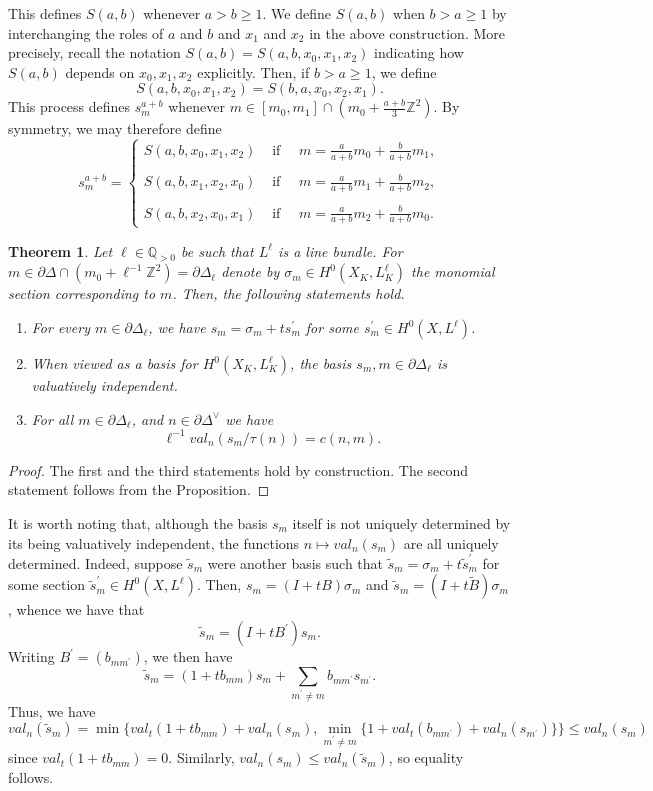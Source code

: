 \documentclass{article}
\newcommand{\QQ}{\mathbb{Q}}
\newcommand{\ZZ}{\mathbb{Z}}
\newtheorem{theorem}{Theorem}
\begin{document}
This defines $S(a,b)$ whenever $a>b\geq 1$. We define $S(a,b)$ when $b>a\geq 1$ by interchanging the roles of $a$ and $b$ and $x_1$ and $x_2$ in the above construction. More precisely, recall the notation $S(a,b) = S(a,b,x_0,x_1,x_2)$ indicating how $S(a,b)$ depends on  $x_0,x_1,x_2$ explicitly. Then, if $b>a\geq 1$, we define
\[
S(a,b,x_0,x_1,x_2) = S(b,a,x_0,x_2,x_1).
\]
This process defines $s^{a+b}_m$ whenever $m\in[m_0,m_1]\cap(m_0+\frac{a+b}{3}\ZZ^2)$. By symmetry, we may therefore define
\[
s^{a+b}_m = \begin{cases}
    S(a,b,x_0,x_1,x_2) & \textrm{ if }\quad m=\frac{a}{a+b}m_0+\frac{b}{a+b}m_1,\\
    \\
    S(a,b,x_1,x_2,x_0) & \textrm{ if }\quad m=\frac{a}{a+b}m_1+\frac{b}{a+b}m_2,\\
    \\
    S(a,b,x_2,x_0,x_1) & \textrm{ if }\quad m=\frac{a}{a+b}m_2+\frac{b}{a+b}m_0.
\end{cases} 
\]
\begin{theorem}
    Let $\ell\in\QQ_{>0}$ be such that $L^\ell$ is a line bundle. For $m\in\partial\Delta\cap(m_0+\ell^{-1}\ZZ^2) = \partial\Delta_\ell$ denote by $\sigma_m \in H^0(X_K,L_K^\ell)$ the monomial section corresponding to $m$. Then, the following statements hold.
    \begin{enumerate}
        \item For every $m\in\partial\Delta_\ell$, we have $s_m= \sigma_m + ts_m^\prime$ for some $s_m^\prime \in H^0(X,L^\ell)$.
        \item When viewed as a basis for $H^0(X_K,L^\ell_K)$, the basis $s_m, m\in\partial\Delta_\ell$ is valuatively independent.
        \item For all $m\in\partial\Delta_\ell$, and $n\in\partial\Delta^\vee$ we have 
        \[
        \ell^{-1}val_n(s_m/\tau(n))=c(n,m).
        \]
    \end{enumerate}  
\end{theorem}
\begin{proof}
    The first and the third statements hold by construction. The second statement follows from the Proposition.
\end{proof}

It is worth noting that, although the basis $s_m$ itself is not uniquely determined by its being valuatively independent, the functions $n\mapsto val_n(s_m)$ are all uniquely determined. Indeed, suppose $\tilde s_m$ were another basis such that $\tilde s_m = \sigma_m + t\tilde s_m^\prime$ for some section $\tilde s^\prime_m\in H^0(X,L^\ell)$. Then, $s_m=(I+tB)\sigma_m$ and $\tilde s_m= (I+t\tilde B)\sigma_m$, whence we have that 
\[
\tilde s_m = (I+tB^\prime)s_m. 
\]
Writing $B^\prime = (b_{m m^\prime})$, we then have 
\[
\tilde s_m = (1+tb_{mm}) s_m + \sum_{m^\prime\neq m} b_{mm^\prime}s_{m^\prime}.
\]
Thus, we have 
\[
val_n(\tilde s_m) = \min\{val_t(1+tb_{mm})+val_n(s_m), \min_{m^\prime\neq m} \{1+val_t(b_{mm^\prime}) +val_n(s_{m^\prime})\}\} \leq val_n(s_m)
\]
since $val_t(1+tb_{mm})=0$. Similarly, $val_n(s_m)\leq val_n(\tilde s_m)$, so equality follows. 
\end{document}

